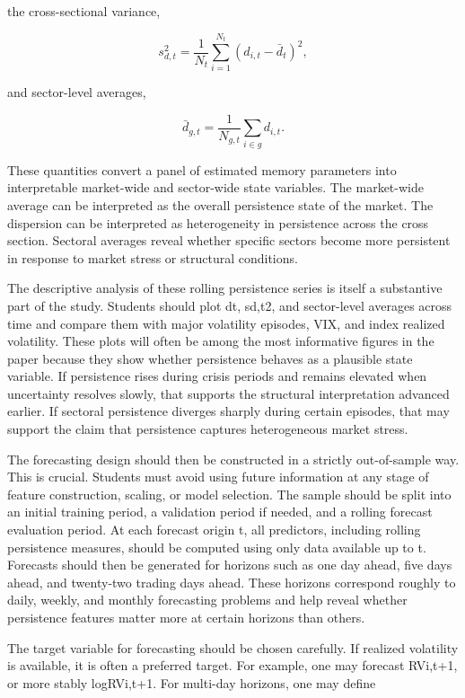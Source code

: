 \documentclass[12pt]{article}
\begin{document}
the cross-sectional variance,

\[s_{d,t}^2 = \frac{1}{N_t}\sum_{i=1}^{N_t}(d_{i,t} - \bar{d}_t)^2,\]

and sector-level averages,

\[\bar{d}_{g,t} = \frac{1}{N_{g,t}}\sum_{i \in g} d_{i,t}.\]

These quantities convert a panel of estimated memory parameters into interpretable market-wide and sector-wide state variables. The market-wide average can be interpreted as the overall persistence state of the market. The dispersion can be interpreted as heterogeneity in persistence across the cross section. Sectoral averages reveal whether specific sectors become more persistent in response to market stress or structural conditions.

The descriptive analysis of these rolling persistence series is itself a substantive part of the study. Students should plot dt, sd,t2, and sector-level averages across time and compare them with major volatility episodes, VIX, and index realized volatility. These plots will often be among the most informative figures in the paper because they show whether persistence behaves as a plausible state variable. If persistence rises during crisis periods and remains elevated when uncertainty resolves slowly, that supports the structural interpretation advanced earlier. If sectoral persistence diverges sharply during certain episodes, that may support the claim that persistence captures heterogeneous market stress.

The forecasting design should then be constructed in a strictly out-of-sample way. This is crucial. Students must avoid using future information at any stage of feature construction, scaling, or model selection. The sample should be split into an initial training period, a validation period if needed, and a rolling forecast evaluation period. At each forecast origin t, all predictors, including rolling persistence measures, should be computed using only data available up to t. Forecasts should then be generated for horizons such as one day ahead, five days ahead, and twenty-two trading days ahead. These horizons correspond roughly to daily, weekly, and monthly forecasting problems and help reveal whether persistence features matter more at certain horizons than others.

The target variable for forecasting should be chosen carefully. If realized volatility is available, it is often a preferred target. For example, one may forecast RVi,t+1, or more stably logRVi,t+1. For multi-day horizons, one may define
\end{document}
